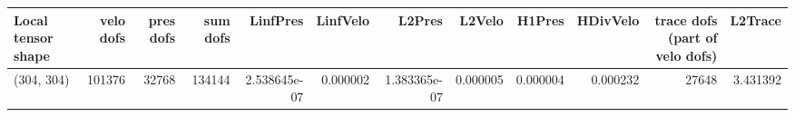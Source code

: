 \begin{tabular}{lrrrrrrrrrrr}
\toprule
Local tensor shape &  velo dofs &  pres dofs &  sum dofs &     LinfPres &  LinfVelo &       L2Pres &   L2Velo &   H1Pres &  HDivVelo &  trace dofs (part of velo dofs) &  L2Trace \\
\midrule
        (304, 304) &     101376 &      32768 &    134144 & 2.538645e-07 &  0.000002 & 1.383365e-07 & 0.000005 & 0.000004 &  0.000232 &                           27648 & 3.431392 \\
\bottomrule
\end{tabular}
